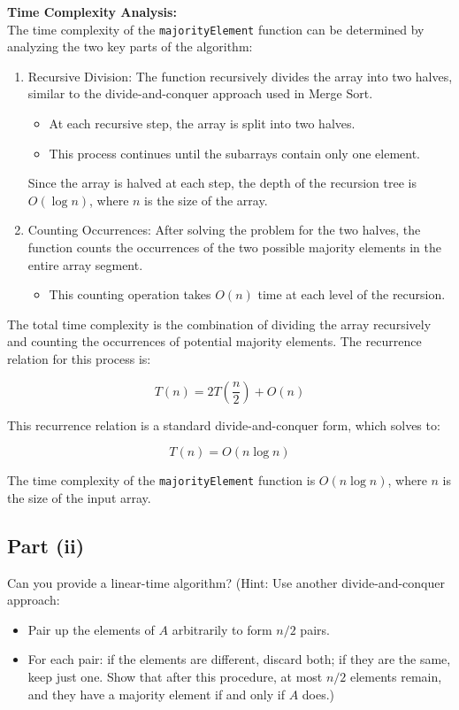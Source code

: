 \documentclass[a4paper,12pt]{report}
\begin{document}
\newpage
\large \textbf{Time Complexity Analysis:} \hfill \\

The time complexity of the \texttt{majorityElement} function can be determined by analyzing the two key parts of the algorithm:

\begin{enumerate}
    \item{Recursive Division:} 
    The function recursively divides the array into two halves, similar to the divide-and-conquer approach used in Merge Sort. 
    \begin{itemize}
        \item At each recursive step, the array is split into two halves.
        \item This process continues until the subarrays contain only one element.
    \end{itemize}
    Since the array is halved at each step, the depth of the recursion tree is $O(\log n)$, where $n$ is the size of the array.

    \item{Counting Occurrences:} 
    After solving the problem for the two halves, the function counts the occurrences of the two possible majority elements in the entire array segment.
    \begin{itemize}
        \item This counting operation takes $O(n)$ time at each level of the recursion.
    \end{itemize}
\end{enumerate}

The total time complexity is the combination of dividing the array recursively and counting the occurrences of potential majority elements. The recurrence relation for this process is:

\[
T(n) = 2T\left(\frac{n}{2}\right) + O(n)
\]

This recurrence relation is a standard divide-and-conquer form, which solves to:

\begin{tcolorbox}[colback=white, colframe=black, boxrule=0.5pt] %
\[
T(n) = O(n \log n)
\]
\end{tcolorbox}
The time complexity of the \texttt{majorityElement} function is $O(n \log n)$, where $n$ is the size of the input array.



\subsection*{Part (ii)}
Can you provide a linear-time algorithm? (Hint: Use another divide-and-conquer approach:
\begin{itemize}
    \item Pair up the elements of \( A \) arbitrarily to form \( n/2 \) pairs.
    \item For each pair: if the elements are different, discard both; if they are the same, keep just one. Show that after this procedure, at most \( n/2 \) elements remain, and they have a majority element if and only if \( A \) does.)
\end{itemize}
\end{document}

